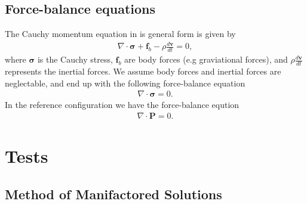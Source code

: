 \documentclass[a4paper,10pt]{article}
\newcommand{\FPiola}{\mathbf{P}}
\newcommand{\Cauchy}{\mathbf{\sigma}}
\begin{document}
\subsection{Force-balance equations}
The Cauchy momentum equation in is general form is given by
\begin{align}
\nabla \cdot \Cauchy + \mathbf{f}_b - \rho \frac{d\mathbf{v}}{dt} = 0,
\end{align}
where $\Cauchy$ is the Cauchy stress, $\mathbf{f}_b$ are body forces
(e.g graviational forces), and $ \rho \frac{d\mathbf{v}}{dt}$
represents the inertial forces. We assume body forces and inertial
forces are neglectable, and end up with the following force-balance
equation
\begin{align}
  \nabla \cdot \Cauchy = 0.
  \label{eq:Force-balance}
\end{align}
In the reference configuration we have the force-balance eqution
\begin{align}
  \nabla \cdot \FPiola = 0.
  \label{eq:Force-balance_ref}
\end{align}

\section{Tests}


\subsection{Method of Manifactored Solutions}
\label{sec:mms2d}
\end{document}
